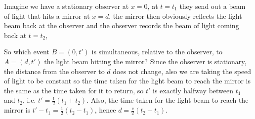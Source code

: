 \documentclass[a4paper,12pt,draft]{report}
\begin{document}
Imagine we have a stationary observer at $x = 0$, at $t = t_1$ they send out a beam of light that hits a mirror at $x = d$, the mirror then obviously reflects the light beam back at the observer and the observer records the beam of light coming back at $t = t_2$,\\
\begin{center}
\end{center}
So which event $B = (0, t')$ is simultaneous, relative to the observer, to $A = (d, t')$ the light beam hitting the mirror? Since the observer is stationary, the distance from the observer to $d$ does not change, also we are taking the speed of light to be constant so the time taken for the light beam to reach the mirror is the same as the time taken for it to return, so $t'$ is exactly halfway between $t_1$ and $t_2$, i.e. $t' = \frac{1}{2}(t_1 + t_2)$. Also, the time taken for the light beam to reach the mirror is $t' - t_1 = \frac{1}{2}(t_2 - t_1)$, hence $d = \frac{c}{2}(t_2 - t_1)$.
\end{document}
